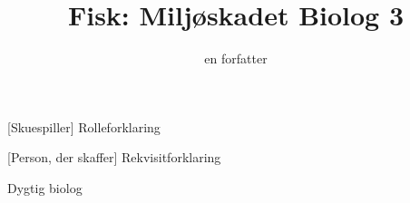 \documentclass[a4paper,11pt]{article}
\title{Fisk: Miljøskadet Biolog 3}
\author{en forfatter}
\begin{document}
\maketitle

\begin{roles}
    [Skuespiller] Rolleforklaring
\end{roles}

\begin{props}
    [Person, der skaffer] Rekvisitforklaring
\end{props}


\begin{sketch}

\scene Dygtig biolog

\end{sketch}
\end{document}
